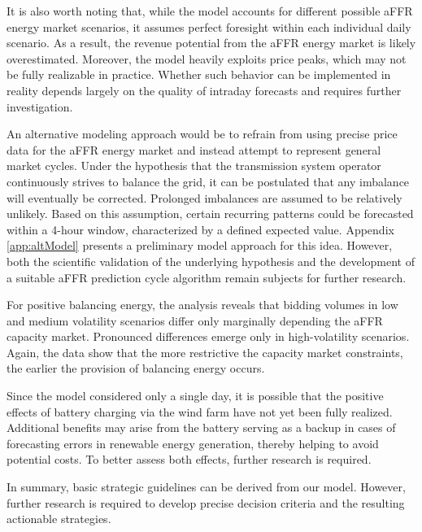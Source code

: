 It is also worth noting that, while the model accounts for different possible aFFR energy market scenarios,
it assumes perfect foresight within each individual daily scenario.
As a result, the revenue potential from the aFFR energy market is likely overestimated.
Moreover, the model heavily exploits price peaks, which may not be fully realizable in practice.
Whether such behavior can be implemented in reality depends largely on the quality of intraday forecasts
and requires further investigation.

An alternative modeling approach would be to refrain from using precise price data for the aFFR energy market
and instead attempt to represent general market cycles.
Under the hypothesis that the transmission system operator continuously strives to balance the grid,
it can be postulated that any imbalance will eventually be corrected.
Prolonged imbalances are assumed to be relatively unlikely.
Based on this assumption, certain recurring patterns could be forecasted within a 4-hour window,
characterized by a defined expected value.
Appendix \ref{app:altModel} presents a preliminary model approach for this idea.
However, both the scientific validation of the underlying hypothesis and the development of a suitable aFFR prediction cycle algorithm
remain subjects for further research.

For positive balancing energy, the analysis reveals that bidding volumes in low and medium volatility scenarios differ only marginally
depending the aFFR capacity market.
Pronounced differences emerge only in high-volatility scenarios. Again, the data show that the more restrictive the capacity market
constraints, the earlier the provision of balancing energy occurs.

Since the model considered only a single day,
it is possible that the positive effects of battery charging
via the wind farm have not yet been fully realized.
Additional benefits may arise from the battery serving as a backup in cases of forecasting errors
in renewable energy generation, thereby helping to avoid potential costs.
To better assess both effects, further research is required.

In summary, basic strategic guidelines can be derived from our model.
However, further research is required to develop precise decision criteria
and the resulting actionable strategies.
